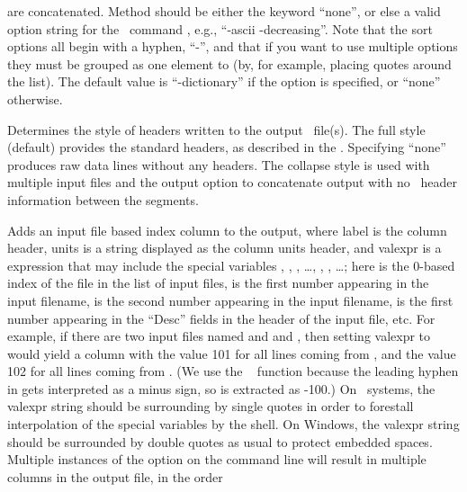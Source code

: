 \begin{description}
  are concatenated.  Method should be either the keyword ``none'', or
  else a valid option string for the \Tcl\ command , e.g.,
  ``-ascii -decreasing''.  Note that the  sort options all
  begin with a hyphen, ``-'', and that if you want to use multiple
  options they must be grouped as one element to  (by,
  for example, placing quotes around the list).  The default value is
  ``-dictionary'' if the  option is specified, or ``none''
  otherwise.
\item[\optkey{-headers \boa full\pipe collapse\pipe none\bca}]
  Determines the style of headers written to the output \ODT\ file(s).
  The full style (default) provides the standard headers, as described
  in the .  Specifying ``none'' produces raw data
  lines without any headers.  The collapse style is used with multiple
  input files and the  output option to concatenate
  output with no \ODT\ header information between the segments.
\item[\optkey{-index label units valexpr}]
  Adds an input file based index column to the output, where label is
  the column header, units is a string displayed as the column units
  header, and valexpr is a \Tcl\  expression that may include
  the special variables , , , \ldots, ,
  , \ldots; here  is the 0-based index of
  the file in the list of input files,  is the first number
  appearing in the input filename,  is the second number
  appearing in the input filename,  is the first number
  appearing in the ``Desc'' fields in the header of the input file,
  etc.  For example, if there are two input files named
   and and , then setting valexpr to
   would yield a column with the value 101 for all lines
  coming from , and the value 102 for all lines coming
  from  .  (We use the \Tcl\  function
   because the leading hyphen in  gets
  interpreted as a minus sign, so  is extracted as -100.)
  On \Unix\ systems, the valexpr string should be surrounding by single
  quotes in order to forestall interpolation of the special variables
  by the shell.  On Windows, the valexpr string should be surrounded
  by double quotes as usual to protect embedded spaces.
  Multiple instances of the  option on the command line
  will result in multiple columns in the output file, in the order

\end{description}
